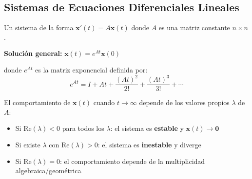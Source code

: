 \subsection{Sistemas de Ecuaciones Diferenciales Lineales}

\begin{definicion}[title=Sistema Lineal Homogéneo]
Un sistema de la forma $\mathbf{x}'(t) = A\mathbf{x}(t)$ donde $A$ es una matriz constante $n \times n$.

\textbf{Solución general:} $\mathbf{x}(t) = e^{At}\mathbf{x}(0)$

donde $e^{At}$ es la matriz exponencial definida por:
$$e^{At} = I + At + \frac{(At)^2}{2!} + \frac{(At)^3}{3!} + \cdots$$
\end{definicion}

\begin{teorema}[title=Comportamiento Asintótico]
El comportamiento de $\mathbf{x}(t)$ cuando $t \to \infty$ depende de los valores propios $\lambda$ de $A$:
\begin{itemize}
    \item Si $\text{Re}(\lambda) < 0$ para todos los $\lambda$: el sistema es \textbf{estable} y $\mathbf{x}(t) \to \mathbf{0}$
    \item Si existe $\lambda$ con $\text{Re}(\lambda) > 0$: el sistema es \textbf{inestable} y diverge
    \item Si $\text{Re}(\lambda) = 0$: el comportamiento depende de la multiplicidad algebraica/geométrica
\end{itemize}
\end{teorema}

